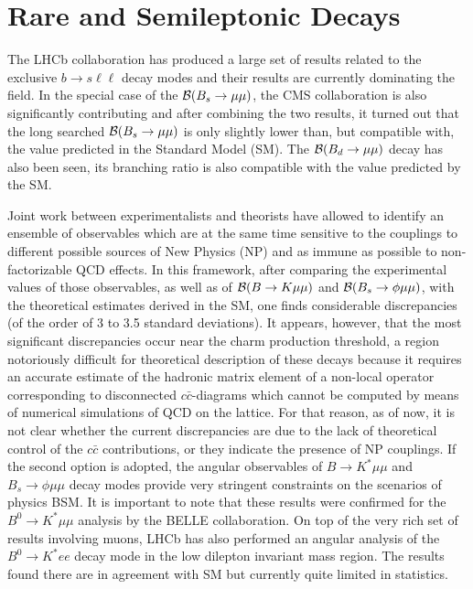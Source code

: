 \newcommand{\cb}{{\cal B}}

 
\section{Rare and Semileptonic Decays}

The LHCb collaboration has produced a large set of results related to the exclusive $b \to s\ell \ell $ decay modes and their results are currently dominating the field. 
In the special case of the $\cb(B_s\to \mu\mu)$, the CMS collaboration is also significantly contributing and after combining the two results, 
it turned out that the long searched $\cb(B_s\to \mu\mu)$ is only slightly lower than, but compatible with, the value
predicted in the Standard Model (SM). The $\cb(B_d\to \mu\mu)$ decay has also been seen, its branching ratio is also compatible with the value predicted by the SM. 

\par
Joint work between experimentalists and theorists have allowed to identify an ensemble of observables which are
at the same time sensitive to the couplings to different possible sources of New Physics (NP) and as immune as possible to non-factorizable QCD effects. 
In this framework, after comparing the experimental values of those observables, as well as of $\cb(B\to K \mu\mu)$ and $\cb(B_s\to \phi \mu\mu)$, with the theoretical estimates derived in the SM, 
one finds considerable discrepancies (of the order of 3 to 3.5 standard deviations). 
It appears, however, that the most significant discrepancies occur near the charm production threshold, a region notoriously difficult for theoretical 
description of these decays because it requires an accurate estimate of the hadronic matrix element of a non-local operator corresponding to disconnected $c\bar c$-diagrams which 
cannot be computed by means of numerical simulations of QCD on the lattice. For that reason, as of now, it is not clear whether the current discrepancies are due to the lack of theoretical 
control of the $c\bar c$ contributions, or they indicate the presence of NP couplings. If the second option is adopted, the angular observables of $B\to K^\ast \mu\mu$ and $B_s\to \phi \mu\mu$ 
decay modes provide very stringent constraints on the scenarios of physics BSM. It is important to note that these results were confirmed for the $B^0\to K^\ast \mu\mu$  analysis by the BELLE collaboration. 
On top of the very rich set of results involving muons, LHCb has also performed an angular analysis  of the $B^0\to K^\ast e e $ decay mode in the low dilepton invariant mass region. The results found there are in agreement with SM but currently quite limited in statistics.  

